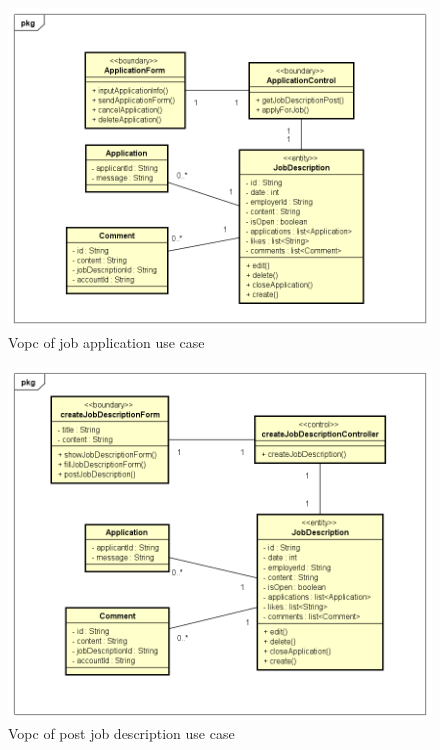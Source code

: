 \documentclass[a4paper]{article}
\begin{document}
\begin{figure}[H]
    \centering
    \includegraphics[width=1.0\textwidth]{vopc_job_application.png}
    \caption{Vopc of job application use case}
    \label{fig:fig25}
\end{figure}

\begin{figure}[H]
    \centering
    \includegraphics[width=1.0\textwidth]{vopc_post_jd.png}
    \caption{Vopc of post job description use case}
    \label{fig:fig26}
\end{figure}
\end{document}

